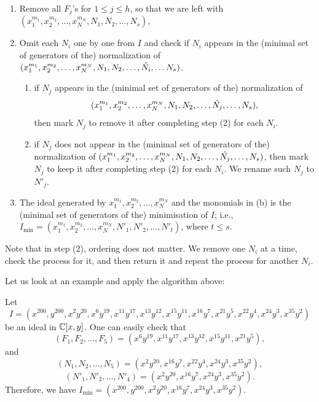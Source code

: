 \documentclass[11pt,a4paper,leqno,noamsfonts]{amsart}
\numberwithin{equation}{section}
\begin{document}
\begin{enumerate}
    \item Remove all $F_j$'s for $1\leq j\leq h$, so that we are left with $(x_{1}^{m_1},x_{2}^{m_2},\ldots,x_{N}^{m_N},N_1,N_2,\ldots,N_s)$,
    \item Omit each $N_i$ one by one from $I$ and check if $N_i$ appears in the (minimal set of generators of the) normalization of  $(x_{1}^{m_1},x_{2}^{m_2},\ldots,x_{N}^{m_N},N_1,N_2,\ldots,\Hat{N_i}, \ldots N_s)$.
    \begin{enumerate}
        \item if $N_j$ appears in the (minimal set of generators of the) normalization of  $$(x_{1}^{m_1},x_{2}^{m_2},\ldots,x_{N}^{m_N},N_1,N_2,\ldots,\Hat{N_j}, \ldots,N_s),$$ then mark $N_j$ to remove it after completing step (2) for each $N_i$.
        \item if $N_j$ does not appear in the (minimal set of generators of the) normalization of  $(x_{1}^{m_1},x_{2}^{m_2},\ldots,x_{N}^{m_N},N_1,N_2,\ldots,\Hat{N_j}, \ldots,N_s)$, then mark $N_j$ to keep it after completing step (2) for each $N_i$. We rename such $N_j$ to $N'_j$.
    \end{enumerate}
    \item The ideal generated by $x_{1}^{m_1},x_{2}^{m_2},\ldots,x_{N}^{m_N}$ and the monomials in (b) is the (minimal set of generators of the) minimisation of $I$; i.e., $I_{\min}=(x_{1}^{m_1},x_{2}^{m_2},\ldots,x_{N}^{m_N},N'_1,N'_2,\ldots,N'_{t})$, where $t \leq s$.
  
\end{enumerate}

\begin{remark}
Note that in step (2), ordering does not matter. We remove one $N_i$ at a time, check the process for it, and then return it and repeat the process for another $N_i$.
\end{remark}

Let us look at an example and apply the algorithm above:
 
\begin{example}
Let $$I=(x^{200},y^{200}, x^2y^{20},x^6y^{19},x^{11}y^{17},x^{13}y^{12},x^{15}y^{11},x^{16}y^{7},x^{21}y^{5},x^{22}y^{4},x^{24}y^{3},x^{35}y^{2})$$  be an ideal in ${\mathbb{C}}[x,y]$. One can easily check that $$(F_1,F_2,\ldots,F_5)=(x^6y^{19},x^{11}y^{17},x^{13}y^{12},x^{15}y^{11},x^{21}y^{5}),$$
and $$(N_1,N_2,\ldots,N_5)=(x^2y^{20},x^{16}y^{7},x^{22}y^{4},x^{24}y^{3},x^{35}y^{2}),$$$$(N'_1,N'_2,\ldots,N'_4)=(x^2y^{20},x^{16}y^{7},x^{24}y^{3},x^{35}y^{2}).$$ Therefore, we have $I_{\min}=(x^{200},y^{200},x^2y^{20},x^{16}y^{7},x^{24}y^{3},x^{35}y^{2})$.
\end{example}
\end{document}
